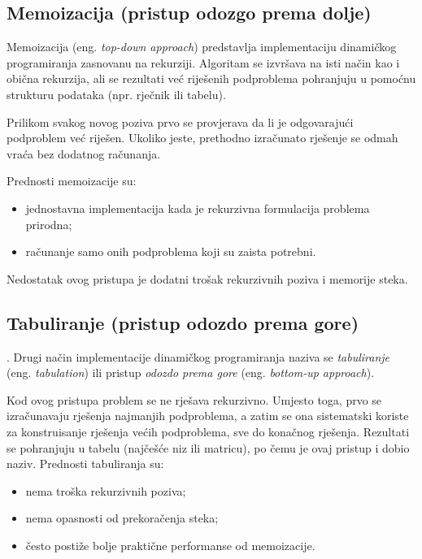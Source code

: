\subsection{Memoizacija (pristup odozgo prema dolje)}

Memoizacija (eng. \emph{top-down approach}) predstavlja implementaciju dinamičkog programiranja zasnovanu na rekurziji. Algoritam se izvršava na isti način kao i obična rekurzija, ali se rezultati već riješenih podproblema pohranjuju u pomoćnu strukturu podataka (npr. rječnik ili tabelu).

Prilikom svakog novog poziva prvo se provjerava da li je odgovarajući podproblem već riješen. Ukoliko jeste, prethodno izračunato rješenje se odmah vraća bez dodatnog računanja.

\medskip

Prednosti memoizacije su:

\begin{itemize}
	\item jednostavna implementacija kada je rekurzivna formulacija problema prirodna;
	\item računanje samo onih podproblema koji su zaista potrebni.
\end{itemize}

Nedostatak ovog pristupa je dodatni trošak rekurzivnih poziva i memorije steka.

\subsection*{Tabuliranje (pristup odozdo prema gore)}. Drugi način implementacije dinamičkog programiranja naziva se \textit{tabuliranje} (eng. \emph{tabulation}) ili pristup \textit{odozdo prema gore} (eng. \emph{bottom-up approach}).

Kod ovog pristupa problem se ne rješava rekurzivno. Umjesto toga, prvo se izračunavaju rješenja najmanjih podproblema, a zatim se ona sistematski koriste za konstruisanje rješenja većih podproblema, sve do konačnog rješenja.  Rezultati se pohranjuju u tabelu (najčešće niz ili matricu), po čemu je ovaj pristup i dobio naziv.  Prednosti tabuliranja su:

\begin{itemize}
	\item nema troška rekurzivnih poziva;
	\item nema opasnosti od prekoračenja steka;
	\item često postiže bolje praktične performanse od memoizacije.
\end{itemize}

